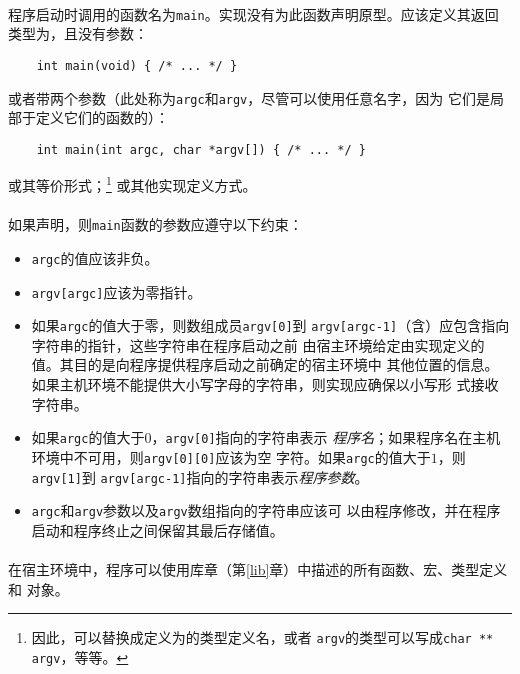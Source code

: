 \paragraph{}
程序启动时调用的函数名为\texttt{main}。实现没有为此函数声明原型。应该定义其返回
类型为，且没有参数：
\begin{lstlisting}
    int main(void) { /* ... */ }
\end{lstlisting}
或者带两个参数（此处称为\texttt{argc}和\texttt{argv}，尽管可以使用任意名字，因为
它们是局部于定义它们的函数的）：
\begin{lstlisting}
    int main(int argc, char *argv[]) { /* ... */ }
\end{lstlisting}
或其等价形式；\footnote{因此，可以替换成定义为的类型定义名，或者
\texttt{argv}的类型可以写成\texttt{char ** argv}，等等。} 或其他实现定义方式。

\paragraph{}
如果声明，则\texttt{main}函数的参数应遵守以下约束：
\begin{itemize}
  \item{\texttt{argc}的值应该非负。}
  \item{\texttt{argv[argc]}应该为零指针。}
  \item{如果\texttt{argc}的值大于零，则数组成员\texttt{argv[0]}到
    \texttt{argv[argc-1]}（含）应包含指向字符串的指针，这些字符串在程序启动之前
    由宿主环境给定由实现定义的值。其目的是向程序提供程序启动之前确定的宿主环境中
    其他位置的信息。如果主机环境不能提供大小写字母的字符串，则实现应确保以小写形
    式接收字符串。}
  \item{如果\texttt{argc}的值大于$0$，\texttt{argv[0]}指向的字符串表示
    \textit{程序名}；如果程序名在主机环境中不可用，则\texttt{argv[0][0]}应该为空
    字符。如果\texttt{argc}的值大于$1$，则\texttt{argv[1]}到
    \texttt{argv[argc-1]}指向的字符串表示\textit{程序参数}。}
  \item{\texttt{argc}和\texttt{argv}参数以及\texttt{argv}数组指向的字符串应该可
    以由程序修改，并在程序启动和程序终止之间保留其最后存储值。}
\end{itemize}

\paragraph{}
在宿主环境中，程序可以使用库章（第\ref{lib}章）中描述的所有函数、宏、类型定义和
对象。

